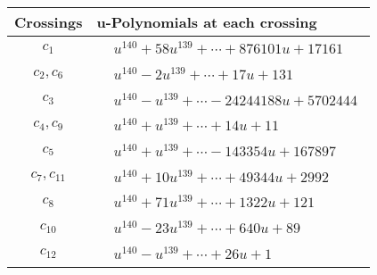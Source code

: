 \documentclass[1p]{elsarticle_modified}
\theoremstyle{definition}
\begin{document}
\begin{tabular}{m{50pt}|m{274pt}}
Crossings & \hspace{64pt}u-Polynomials at each crossing \\
\hline $$\begin{aligned}c_{1}\end{aligned}$$&$\begin{aligned}
&u^{140}+58 u^{139}+\cdots+876101 u+17161
\end{aligned}$\\
\hline $$\begin{aligned}c_{2},c_{6}\end{aligned}$$&$\begin{aligned}
&u^{140}-2 u^{139}+\cdots+17 u+131
\end{aligned}$\\
\hline $$\begin{aligned}c_{3}\end{aligned}$$&$\begin{aligned}
&u^{140}- u^{139}+\cdots-24244188 u+5702444
\end{aligned}$\\
\hline $$\begin{aligned}c_{4},c_{9}\end{aligned}$$&$\begin{aligned}
&u^{140}+u^{139}+\cdots+14 u+11
\end{aligned}$\\
\hline $$\begin{aligned}c_{5}\end{aligned}$$&$\begin{aligned}
&u^{140}+u^{139}+\cdots-143354 u+167897
\end{aligned}$\\
\hline $$\begin{aligned}c_{7},c_{11}\end{aligned}$$&$\begin{aligned}
&u^{140}+10 u^{139}+\cdots+49344 u+2992
\end{aligned}$\\
\hline $$\begin{aligned}c_{8}\end{aligned}$$&$\begin{aligned}
&u^{140}+71 u^{139}+\cdots+1322 u+121
\end{aligned}$\\
\hline $$\begin{aligned}c_{10}\end{aligned}$$&$\begin{aligned}
&u^{140}-23 u^{139}+\cdots+640 u+89
\end{aligned}$\\
\hline $$\begin{aligned}c_{12}\end{aligned}$$&$\begin{aligned}
&u^{140}- u^{139}+\cdots+26 u+1
\end{aligned}$\\
\hline
\end{tabular}\\~\\
\end{document}
